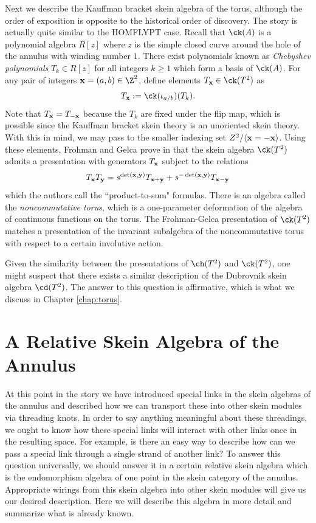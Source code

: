 Next we describe the Kauffman bracket skein algebra of the torus, although the order of exposition is opposite to the historical order of discovery. The story is actually quite similar to the HOMFLYPT case. Recall that $\ck(A)$ is a polynomial algebra $R[z]$ where $z$ is the simple closed curve around the hole of the annulus with winding number $1$. There exist polynomials known as \textit{Chebyshev polynomials} $T_k \in R[z]$ for all integers $k \geq 1$ which form a basis of $\ck(A)$. For any pair of integers $\xx = (a, b) \in \Z^2$, define elements $T_\xx \in \ck(T^2)$ as 
\[
T_\xx := \ck(\iota_{a/b})(T_k).
\]
Note that $T_{\mathbf{x}} = T_{-{\mathbf{x}}}$ because the $T_k$ are fixed under the flip map, which is possible since the Kauffman bracket skein theory is an unoriented skein theory. With this in mind, we may pass to the smaller indexing set $Z^2 / \langle {\mathbf{x}} = -{\mathbf{x}} \rangle$. Using these elements, Frohman and Gelca prove in \cite{FG00} that the skein algebra $\ck(T^2)$ admits a presentation with generators $T_{\mathbf{x}}$ subject to the relations
\[
T_{\mathbf{x}} T_{\mathbf{y}} = s^{\det({\mathbf{x}}, {\mathbf{y}})} T_{{\mathbf{x}} + {\mathbf{y}}} + s^{-\det({\mathbf{x}}, {\mathbf{y}})} T_{{\mathbf{x}} - {\mathbf{y}}}
\]
which the authors call the ``product-to-sum" formulas. There is an algebra called the \textit{noncommutative torus}, which is a one-parameter deformation of the algebra of continuous functions on the torus. The Frohman-Gelca presentation of $\ck(T^2)$ matches a presentation of the invariant subalgebra of the noncommutative torus with respect to a certain involutive action.

Given the similarity between the presentations of $\ch(T^2)$ and $\ck(T^2)$, one might suspect that there exists a similar description of the Dubrovnik skein algebra $\cd(T^2)$. The answer to this question is affirmative, which is what we discuss in Chapter \ref{chap:torus}.


\section{A Relative Skein Algebra of the Annulus} \label{sec:relativeannulus}

At this point in the story we have introduced special links in the skein algebras of the annulus and described how we can transport these into other skein modules via threading knots. In order to say anything meaningful about these threadings, we ought to know how these special links will interact with other links once in the resulting space. For example, is there an easy way to describe how can we pass a special link through a single strand of another link? To answer this question universally, we should answer it in a certain relative skein algebra which is the endomorphism algebra of one point in the skein category of the annulus. Appropriate wirings from this skein algebra into other skein modules will give us our desired description. Here we will describe this algebra in more detail and summarize what is already known. 


